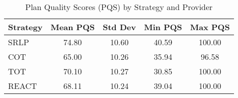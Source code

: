 \begin{table}[htbp]
\centering
\caption{Plan Quality Scores (PQS) by Strategy and Provider}
\label{tab:pqs_by_strategy}
\begin{tabular}{lcccc}
\toprule
Strategy & Mean PQS & Std Dev & Min PQS & Max PQS \\
\midrule
SRLP & 74.80 & 10.60 & 40.59 & 100.00 \\
COT & 65.00 & 10.26 & 35.94 & 96.58 \\
TOT & 70.10 & 10.27 & 30.85 & 100.00 \\
REACT & 68.11 & 10.24 & 39.04 & 100.00 \\
\bottomrule
\end{tabular}
\end{table}